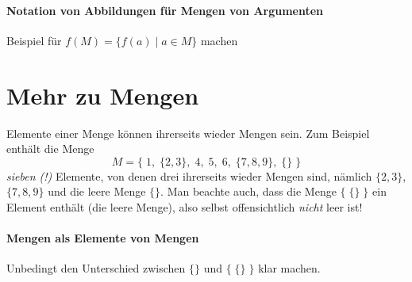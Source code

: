 \begin{tutorium}
  \paragraph{Notation von Abbildungen für Mengen von Argumenten}

  Beispiel für $f(M) = \{ f(a) \mid a \in M \}$ machen
\end{tutorium}

\Tut\section{Mehr zu Mengen}

Elemente einer Menge können ihrerseits wieder Mengen sein.
%
Zum Beispiel enthält die Menge
\[
  M = \{\; 1, \; \{2,3\}, \; 4,\; 5,\; 6, \; \{7,8,9\}, \; \{\} \; \}
\]
\emph{sieben (!)} Elemente, von denen drei ihrerseits wieder Mengen
sind, nämlich $\{2,3\}$, $\{7,8,9\}$ und die leere Menge $\{\}$.
%
Man beachte auch, dass die Menge $\{ \;\{\}\;\}$ ein Element enthält
(die leere Menge), also selbst offensichtlich \emph{nicht} leer ist!
%
\begin{tutorium}
  \paragraph{Mengen als Elemente von Mengen}

  Unbedingt den Unterschied zwischen $\{\}$ und $\{ \;\{\}\;\}$ klar
  machen.
\end{tutorium}

